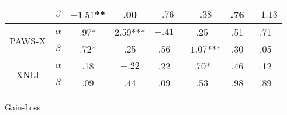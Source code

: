 {{\begin{tabular}{llcccccc}
      \multicolumn{1}{c}{}                         & $\beta$   & \multicolumn{1}{c|}{\cellcolor{blue} $-1.51$**}       & \multicolumn{1}{c|}{\cellcolor{llight-blue} .00}     & \multicolumn{1}{c|}{\cellcolor{blue} $-.76$}          & \multicolumn{1}{c|}{\cellcolor{dark-blue} $-.38$}      & \multicolumn{1}{c|}{\cellcolor{blue} .76}           & \multicolumn{1}{c}{\cellcolor{dark-blue} $-1.13$}   \\ \hline
      \multicolumn{1}{c}{\multirow{2}{*}{PAWS-X}}  & $\alpha$  & \multicolumn{1}{c|}{\cellcolor{blue} .97*}            & \multicolumn{1}{c|}{\cellcolor{dark-blue} 2.59***}   & \multicolumn{1}{c|}{\cellcolor{blue} $-.41$}          & \multicolumn{1}{c|}{\cellcolor{dark-blue} .25}         & \multicolumn{1}{c|}{\cellcolor{llight-blue} .51}     & \multicolumn{1}{c}{\cellcolor{dark-blue} .71}       \\
      \multicolumn{1}{c}{}                         & $\beta$   & \multicolumn{1}{c|}{\cellcolor{dark-blue} .72*}       & \multicolumn{1}{c|}{\cellcolor{dark-blue} .25}       & \multicolumn{1}{c|}{\cellcolor{blue} .56}             & \multicolumn{1}{c|}{\cellcolor{dark-blue} $-1.07$***}  & \multicolumn{1}{c|}{\cellcolor{dark-blue} .30}      & \multicolumn{1}{c}{\cellcolor{dark-blue} .05}       \\ \cline{3-8}
      \multicolumn{1}{c}{\multirow{2}{*}{XNLI}}    & $\alpha$  & \multicolumn{1}{c|}{\cellcolor{blue} .18}             & \multicolumn{1}{c|}{\cellcolor{blue} $-.22$}         & \multicolumn{1}{c|}{\cellcolor{blue} .22}             & \multicolumn{1}{c|}{\cellcolor{blue} .70*}             & \multicolumn{1}{c|}{\cellcolor{dark-blue} .46}      & \multicolumn{1}{c}{\cellcolor{dark-blue} .12}       \\
      \multicolumn{1}{c}{}                         & $\beta$   & \multicolumn{1}{c|}{\cellcolor{blue} .09}             & \multicolumn{1}{c|}{\cellcolor{dark-blue} .44}       & \multicolumn{1}{c|}{\cellcolor{dark-blue} .09}        & \multicolumn{1}{c|}{\cellcolor{blue} .53}              & \multicolumn{1}{c|}{\cellcolor{blue} .98}           & \multicolumn{1}{c}{\cellcolor{dark-blue} .89}       \\ %
     \end{tabular}
    }
  }{Gain-Loss}

